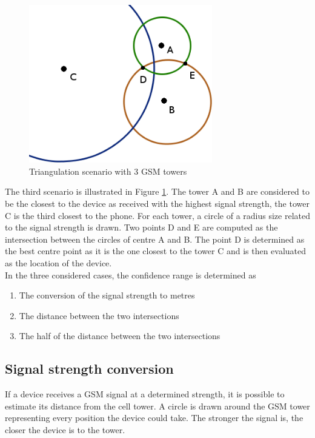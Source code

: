 \begin{figure}[h]
  \centering
  \includegraphics[width=8cm]{images/tower-schema.png}
  \caption{Triangulation scenario with 3 GSM towers}
  \label{fig:triangulation-scenario-3}
\end{figure}
The third scenario is illustrated in Figure \ref{fig:triangulation-scenario-3}.
The tower A and B are considered to be the closest to the device as received with the highest signal strength, the tower C is the third closest to the phone.
For each tower, a circle of a radius size related to the signal strength is drawn.
Two points D and E are computed as the intersection between the circles of centre A and B.
The point D is determined as the best centre point as it is the one closest to the tower C and is then evaluated as the location of the device.\\

In the three considered cases, the confidence range is determined as
\begin{enumerate}
\item The conversion of the signal strength to metres
\item The distance between the two intersections
\item The half of the distance between the two intersections
\end{enumerate}


\subsection{Signal strength conversion}

If a device receives a GSM signal at a determined strength, it is possible to estimate its distance from the cell tower.
A circle is drawn around the GSM tower representing every position the device could take.
The stronger the signal is, the closer the device is to the tower.\\

